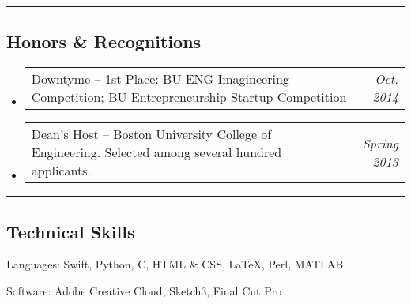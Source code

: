 \documentclass[10pt,letterpaper]{article}
\makeatletter
\newenvironment{indentsection}[1]%
{\begin{list}{}%
	{\setlength{\leftmargin}{#1}}%
	\item[]%
}
{\end{list}}
\newcommand{\headerrow}[2]
{\begin{tabular*}{\linewidth}{l@{\extracolsep{\fill}}r}
	#1 &
	#2 \\
\end{tabular*}}
\newcommand{\CPP}
{C\nolinebreak[4]\hspace{-.05em}\raisebox{.22ex}{\footnotesize\bf ++}}
\makeatother
\begin{document}
\hrule
\vspace{-0.9em}
\subsection*{Honors \& Recognitions}

\begin{itemize}
	\parskip=0.001em
	
	\item
	\headerrow
	{Downtyme -- 1st Place: BU ENG Imagineering Competition; BU Entrepreneurship Startup Competition}
	{\emph{Oct. 2014}}
	
	\item
	\headerrow
	{Dean's Host -- Boston University College of Engineering. Selected among several hundred applicants.}
	{\emph{Spring 2013}}

\end{itemize}


\hrule
\vspace{-0.8em}

\subsection*{Technical Skills}

\begin{indentsection}{\parindent}
	\begin{description*}
		\item[Languages:]
		Swift, Python, \CPP, HTML \& CSS, \LaTeX, Perl, MATLAB
		\item[Software:]
		Adobe Creative Cloud, Sketch3, Final Cut Pro
	\end{description*}
\end{indentsection}

	
\end{document}
